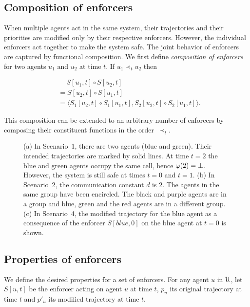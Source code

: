 \subsection{Composition of enforcers}

When multiple agents act in the same system, their trajectories and their priorities are modified only by their respective enforcers. However, the individual enforcers act together to make the system safe. The joint behavior of enforcers are captured by functional composition.  We first define \emph{composition of enforcers} for two agents $u_1$ and $u_2$ at time $t$. If $u_1 \prec_t u_2$ then

\begin{align}
    &\quad~S[u_1,t] \circ S[u_2,t] \nonumber \\ 
    &= S[u_2,t] \circ S[u_1,t] \\
    &=\langle S_1[u_2,t] \circ S_1[u_1,t], S_2[u_2,t] \circ S_2[u_1,t]\rangle. %
\end{align}

This composition can be extended to an arbitrary number of enforcers by composing their constituent functions in the order~$\prec_t$.

\begin{figure*}[tbh]
\centering
{}
\caption[Examples of unsafe behavior, real-time  communication groups, and resulting safe behavior.]{(a) In Scenario~1, there are two agents (blue and green). Their intended trajectories are marked by solid lines. At time $t=2$ the blue and green agents occupy the same cell, hence $\varphi(2) = \bot$. However, the system is still safe at times $t=0$ and $t=1$.
(b) In Scenario~2, the communication constant $d$ is $2$. The agents in the same group have been encircled. The black and purple agents are in a group and blue, green and the red agents are in a different group. (c)  In Scenario~4, the modified trajectory for the blue agent as a consequence of the enforcer $S[blue,0]$ on the blue agent at $t=0$ is shown.}
\label{fig:eg7}
\end{figure*}

\subsection*{Properties of enforcers}
We define the desired properties for a set of enforcers. 
For any agent $u$ in $\mathcal{U}$, let $S[u,t]$ be the enforcer acting on agent $u$ at time $t$, $p_u$ its original trajectory at time $t$ and $p'_u$ its modified trajectory at time $t$.  

